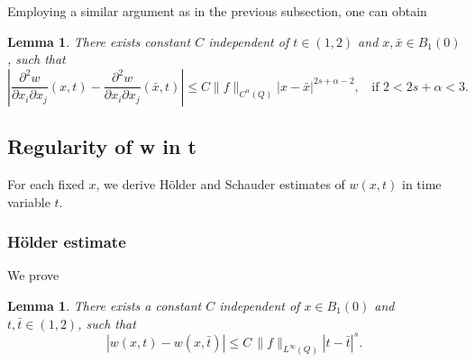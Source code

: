 \documentclass[12pt]{article}
\newtheorem{lemma}[definition]{Lemma}
\theoremstyle{remark}
\numberwithin{equation}{section}
\begin{document}
Employing a similar argument as in the previous subsection, one can obtain
\begin{lemma} \label{lem4.6}
 There exists constant $C$ independent of $t \in (1,2)$ and $x, \bar{x} \in B_1(0)$, such that
\begin{equation} \label{3.30a}
\left| \frac{\partial^2 w}{\partial x_i \partial x_j}(x,t) - \frac{\partial^2 w}{\partial x_i \partial x_j}(\bar{x},t) \right| \leq C
\|f\|_{C^\alpha(Q)} |x - \bar{x}|^{2s +\alpha -2}, \;\; \mbox{ if } 2 < 2s + \alpha < 3.
\end{equation}
\end{lemma}



\subsection{Regularity of w in t}

For each fixed $x$, we derive H\"{o}lder and Schauder estimates of $w(x,t)$ in time variable $t$.

\subsubsection{H\"{o}lder estimate}

We prove
\begin{lemma} \label{lem4.7}  There exists a constant $C$ independent of  $x \in B_1(0)$ and $t, \bar{t} \in (1,2)$,  such that
\begin{equation}
| w(x,t) - w(x, \bar{t}) | \leq C \, \|f\|_{L^\infty (Q)} |t - \bar{t}|^s.
\label{Ewt1}
\end{equation}
\end{lemma}
\end{document}
